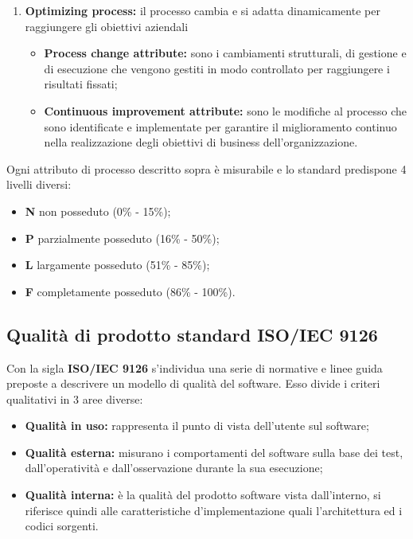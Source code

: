 \begin{enumerate}[label*=\arabic*]
\item \textbf{Optimizing process:} il processo cambia e si adatta dinamicamente per raggiungere gli obiettivi aziendali
		\begin{itemize}
			\item \textbf{Process change attribute:} sono i cambiamenti strutturali, di gestione e di esecuzione che vengono gestiti in modo controllato per raggiungere i risultati fissati;
			\item \textbf{Continuous improvement attribute:} sono le modifiche al processo che sono identificate e implementate per garantire il miglioramento continuo nella realizzazione degli obiettivi di \gls{business} dell'organizzazione.
		\end{itemize}

\end{enumerate}

\noindent Ogni attributo di processo descritto sopra è misurabile e lo standard predispone 4 livelli diversi:
\begin{itemize}[label={}]
	\item \textbf{N} non posseduto (0\% - 15\%);
	\item \textbf{P} parzialmente posseduto (16\% - 50\%);
	\item \textbf{L} largamente posseduto (51\% - 85\%);
	\item \textbf{F} completamente posseduto (86\% - 100\%).
\end{itemize}


\subsection{Qualità di prodotto standard ISO/IEC 9126} \label{9126}
Con la sigla \textbf{ISO/IEC 9126} s'individua una serie di normative e linee guida preposte a descrivere un modello di qualità del software.
Esso divide i criteri qualitativi in 3 aree diverse:
\begin{itemize}

	\item \textbf{Qualità in uso:} rappresenta il punto di vista dell'utente sul software;
	\item \textbf{Qualità esterna:} misurano i comportamenti del software sulla base dei test, dall'operatività e dall'osservazione durante la sua esecuzione;
	\item \textbf{Qualità interna:} è la qualità del prodotto software vista dall'interno, si riferisce quindi alle caratteristiche d'implementazione quali l'architettura ed i codici sorgenti.
\end{itemize}


